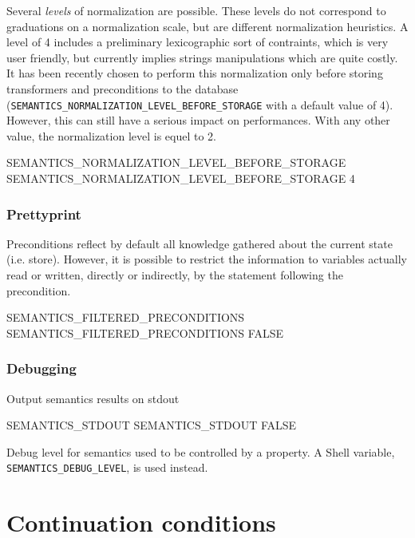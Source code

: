 \documentclass[a4paper]{report}
\begin{document}
Several \emph{levels} of normalization are possible. These levels do
not correspond to graduations on a normalization scale, but are
different normalization heuristics. A level of 4 includes a
preliminary lexicographic sort of contraints, which is very user
friendly, but currently implies strings manipulations which are quite
costly. It has been recently chosen to perform this normalization only
before storing transformers and preconditions to the database
(\texttt{SEMANTICS\_NORMALIZATION\_LEVEL\_BEFORE\_STORAGE} with a
default value of 4). However, this can still have a serious impact on
performances. With any other value, the normalization level is equel to 2.

\begin{PipsProp}{SEMANTICS_NORMALIZATION_LEVEL_BEFORE_STORAGE}
SEMANTICS_NORMALIZATION_LEVEL_BEFORE_STORAGE 4
\end{PipsProp}

\subsubsection{Prettyprint}

Preconditions reflect by default all knowledge gathered about the current
state (i.e. store). However, it is possible to restrict the information to
variables actually read or written, directly or indirectly, by the
statement following the precondition.

\begin{PipsProp}{SEMANTICS_FILTERED_PRECONDITIONS}
SEMANTICS_FILTERED_PRECONDITIONS FALSE
\end{PipsProp}


\subsubsection{Debugging}

Output semantics results on stdout

\begin{PipsProp}{SEMANTICS_STDOUT}
SEMANTICS_STDOUT FALSE
\end{PipsProp}

Debug level for semantics used to be controlled by a property. A Shell
variable, \verb/SEMANTICS_DEBUG_LEVEL/, is used instead.



\section{Continuation conditions}
\label{subsection-continuation-conditions}
\end{document}
